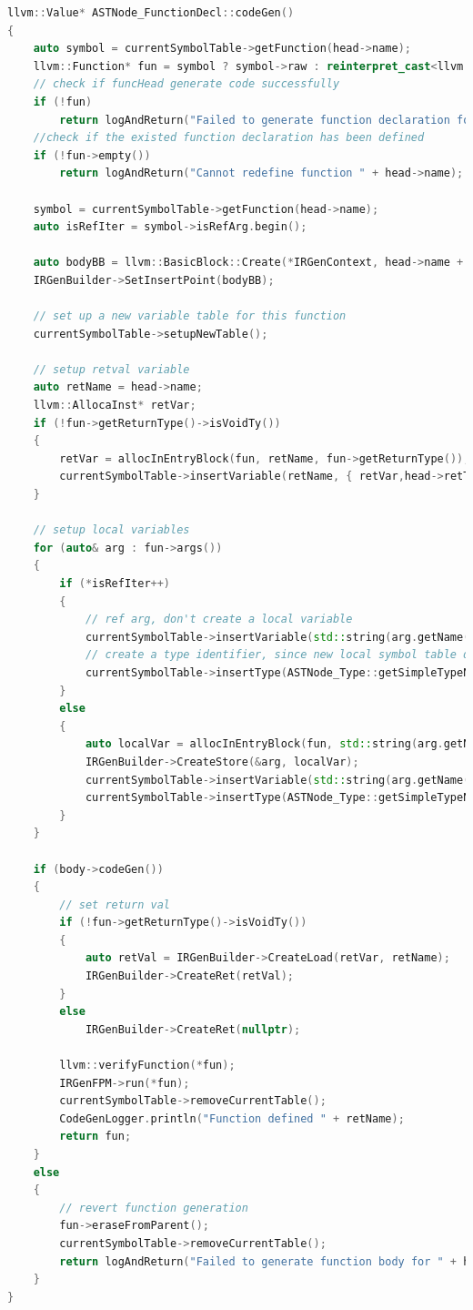 \documentclass{article}
\begin{document}
\begin{lstlisting}[language=C++]
llvm::Value* ASTNode_FunctionDecl::codeGen()
{
    auto symbol = currentSymbolTable->getFunction(head->name);
    llvm::Function* fun = symbol ? symbol->raw : reinterpret_cast<llvm::Function*>(head->codeGen());
    // check if funcHead generate code successfully
    if (!fun)
        return logAndReturn("Failed to generate function declaration for " + head->name);
    //check if the existed function declaration has been defined
    if (!fun->empty())
        return logAndReturn("Cannot redefine function " + head->name);

    symbol = currentSymbolTable->getFunction(head->name);
    auto isRefIter = symbol->isRefArg.begin();

    auto bodyBB = llvm::BasicBlock::Create(*IRGenContext, head->name + "_entry", fun);
    IRGenBuilder->SetInsertPoint(bodyBB);

    // set up a new variable table for this function
    currentSymbolTable->setupNewTable();

    // setup retval variable
    auto retName = head->name;
    llvm::AllocaInst* retVar;
    if (!fun->getReturnType()->isVoidTy())
    {
        retVar = allocInEntryBlock(fun, retName, fun->getReturnType());
        currentSymbolTable->insertVariable(retName, { retVar,head->retType->toString() });
    }

    // setup local variables
    for (auto& arg : fun->args())
    {
        if (*isRefIter++)
        {
            // ref arg, don't create a local variable
            currentSymbolTable->insertVariable(std::string(arg.getName()), { &arg,ASTNode_Type::getSimpleTypeName(arg.getType()) });
            // create a type identifier, since new local symbol table doesn't have any info about it
            currentSymbolTable->insertType(ASTNode_Type::getSimpleTypeName(arg.getType()), { arg.getType() });
        }
        else
        {
            auto localVar = allocInEntryBlock(fun, std::string(arg.getName()), arg.getType());
            IRGenBuilder->CreateStore(&arg, localVar);
            currentSymbolTable->insertVariable(std::string(arg.getName()), { localVar,ASTNode_Type::getSimpleTypeName(arg.getType()) });
            currentSymbolTable->insertType(ASTNode_Type::getSimpleTypeName(arg.getType()), { arg.getType() });
        }
    }

    if (body->codeGen())
    {
        // set return val
        if (!fun->getReturnType()->isVoidTy())
        {
            auto retVal = IRGenBuilder->CreateLoad(retVar, retName);
            IRGenBuilder->CreateRet(retVal);
        }
        else
            IRGenBuilder->CreateRet(nullptr);

        llvm::verifyFunction(*fun);
        IRGenFPM->run(*fun);
        currentSymbolTable->removeCurrentTable();
        CodeGenLogger.println("Function defined " + retName);
        return fun;
    }
    else
    {
        // revert function generation
        fun->eraseFromParent();
        currentSymbolTable->removeCurrentTable();
        return logAndReturn("Failed to generate function body for " + head->name);
    }
}
\end{lstlisting}
\end{document}
